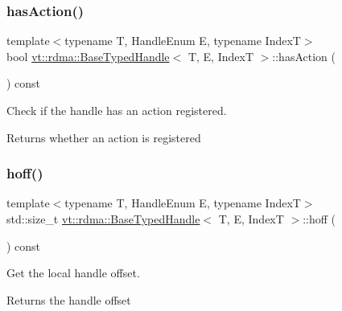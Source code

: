 \subsubsection{\texorpdfstring{has\+Action()}{hasAction()}}
{\footnotesize\ttfamily template$<$typename T, Handle\+Enum E, typename IndexT$>$ \\
bool \hyperlink{structvt_1_1rdma_1_1_base_typed_handle}{vt\+::rdma\+::\+Base\+Typed\+Handle}$<$ T, E, IndexT $>$\+::has\+Action (\begin{DoxyParamCaption}{ }\end{DoxyParamCaption}) const\hspace{0.3cm}{\ttfamily [inline]}}



Check if the handle has an action registered. 

\begin{DoxyReturn}{Returns}
whether an action is registered 
\end{DoxyReturn}
\mbox{\label{structvt_1_1rdma_1_1_base_typed_handle_a98bab5e776934a84c4415952823f58e0}} 
\subsubsection{\texorpdfstring{hoff()}{hoff()}}
{\footnotesize\ttfamily template$<$typename T, Handle\+Enum E, typename IndexT$>$ \\
std\+::size\+\_\+t \hyperlink{structvt_1_1rdma_1_1_base_typed_handle}{vt\+::rdma\+::\+Base\+Typed\+Handle}$<$ T, E, IndexT $>$\+::hoff (\begin{DoxyParamCaption}{ }\end{DoxyParamCaption}) const\hspace{0.3cm}{\ttfamily [inline]}}



Get the local handle offset. 

\begin{DoxyReturn}{Returns}
the handle offset 
\end{DoxyReturn}
\mbox{\label{structvt_1_1rdma_1_1_base_typed_handle_af7897dce38a16c31e3431cf65dec2792}} 
